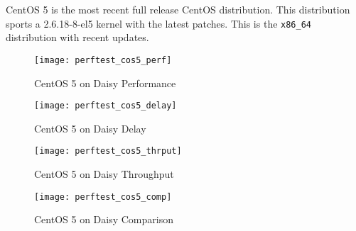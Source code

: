 \documentclass[letterpaper,final,notitlepage,twocolumn,10pt,twoside]{article}
\begin{document}
CentOS 5 is the most recent full release CentOS distribution.  This
distribution sports a 2.6.18-8-el5 kernel with the latest patches.  This
is the \texttt{x86\_64} distribution with recent updates.

\begin{figure}[p]
\texttt{[image: perftest\_cos5\_perf]}
\caption[CentOS 5 on Daisy Performance]{CentOS 5 on Daisy Performance}
\label{figure:cos5perf}
\end{figure}

\begin{figure}[p]
\texttt{[image: perftest\_cos5\_delay]}
\caption[CentOS 5 on Daisy Delay]{CentOS 5 on Daisy Delay}
\label{figure:cos5delay}
\end{figure}

\begin{figure}[p]
\texttt{[image: perftest\_cos5\_thrput]}
\caption[CentOS 5 on Daisy Throughput]{CentOS 5 on Daisy Throughput}
\label{figure:cos5thrput}
\end{figure}

\begin{figure}[p]
\texttt{[image: perftest\_cos5\_comp]}
\caption[CentOS 5 on Daisy Comparison]{CentOS 5 on Daisy Comparison}
\label{figure:cos5comp}
\end{figure}
\end{document}
